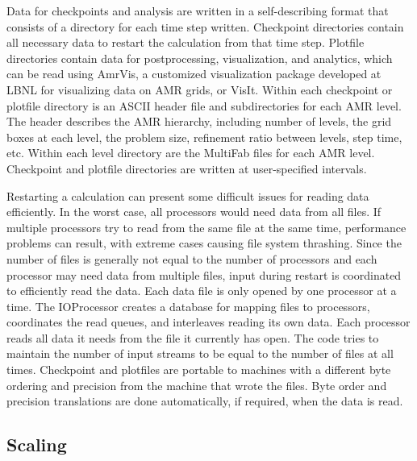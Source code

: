 Data for checkpoints and analysis are written in a self-describing format that consists 
of a directory for each time step written. Checkpoint directories contain all necessary 
data to restart the calculation from that time step. Plotfile directories contain data 
for postprocessing, visualization, and analytics, which can be read using AmrVis, a 
customized visualization package developed at LBNL for visualizing data on AMR grids, or 
VisIt. Within each checkpoint or plotfile directory is an ASCII header file and 
subdirectories for each AMR level. The header describes the AMR hierarchy, including 
number of levels, the grid boxes at each level, the problem size, refinement ratio 
between levels, step time, etc. Within each level directory are the MultiFab files for 
each AMR level. Checkpoint and plotfile directories are written at user-specified intervals. 

Restarting a calculation can present some difficult issues for reading data efficiently. 
In the worst case, all processors would need data from all files. If multiple processors 
try to read from the same file at the same time, performance problems can result, with 
extreme cases causing file system thrashing. Since the number of files is generally not 
equal to the number of processors and each processor may need data from multiple files, 
input during restart is coordinated to efficiently read the data. Each data file is only 
opened by one processor at a time. The IOProcessor creates a database for mapping files 
to processors, coordinates the read queues, and interleaves reading its own data. Each 
processor reads all data it needs from the file it currently has open. The code tries to 
maintain the number of input streams to be equal to the number of files at all times. 
Checkpoint and plotfiles are portable to machines with a different byte ordering and 
precision from the machine that wrote the files. Byte order and precision translations 
are done automatically, if required, when the data is read.

\subsection{Scaling}

